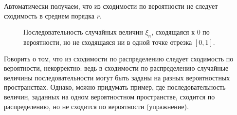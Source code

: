 \documentclass[../main.tex]{subfiles}
\begin{document}
Автоматически получаем, что из сходимости по вероятности не следует сходимость в среднем порядка $ r $.

\begin{figure}[ht]
 \centering
 \caption{Последовательность случайных величин $\xi_n$, сходящаяся к $0$ по вероятности, но не сходящаяся ни в одной точке отрезка $[0,1]$.}
 \label{fig:function_sequence_converges_by_measure_but_not_in_any_point}
\end{figure}

Говорить о том, что из сходимости по распределению следует сходимость по вероятности, некорректно: ведь в сходимости по распределению случайные величины последовательности могут быть заданы на разных вероятностных пространствах. Однако, можно придумать пример, где последовательность величин, заданных на одном вероятностном пространстве, сходится по распределению, но не сходится по вероятности (упражнение).
\end{document}
